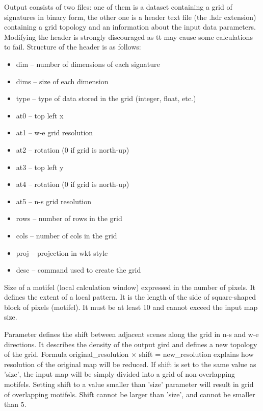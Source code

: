 
Output consists of two files: one of them is a dataset containing a grid of signatures in binary form, the other one is a header text file (the .hdr extension) containing a grid topology and an information about the input data parameters.
Modifying the header is strongly discouraged as tt may cause some calculations to fail. 
Structure of the header is as follows:\\

\begin{itemize}
	\item dim -- number of dimensions of each signature
	\item dims -- size of each dimension
	\item type -- type of data stored in the grid (integer, float, etc.)
	\item at0 -- top left x
	\item at1 -- w-e grid resolution
	\item at2 -- rotation (0 if grid is north-up)
	\item at3 -- top left y
	\item at4 -- rotation (0 if grid is north-up)
	\item at5 -- n-s grid resolution
	\item rows -- number of rows in the grid
	\item cols -- number of cols in the grid
	\item proj -- projection in wkt style
	\item desc -- command used to create the grid
\end{itemize}


Size of a motifel (local calculation window) expressed in the number of pixels. 
It defines the extent of a local pattern.
It is the length of the side of square-shaped block of pixels (motifel).
It must be at least 10 and cannot exceed the input map size.


Parameter defines the shift between adjacent scenes along the grid in n-s and w-e directions. It describes the density of the output gird and defines a new topology of the grid. Formula original\_resolution $\times$ shift = new\_resolution explains how resolution of the original map will be reduced. If shift is set to the same value as 'size', the input map will be simply divided into a grid of non-overlapping motifels. Setting shift to a value smaller than 'size' parameter will result in grid of overlapping motifels. Shift cannot be larger than 'size', and cannot be smaller than 5.

